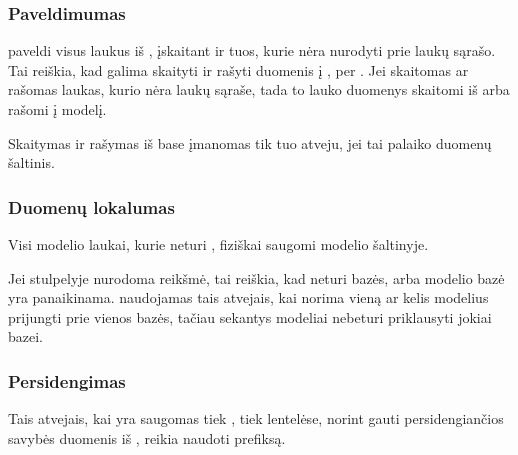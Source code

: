 \documentclass[letterpaper,10pt,lithuanian]{sphinxmanual}
\begin{document}
\subsubsection{Paveldimumas}
\label{\detokenize{dimensijos:paveldimumas}}
\sphinxAtStartPar
{\hyperref[\detokenize{formatas:model}]{}} paveldi visus laukus iš {\hyperref[\detokenize{formatas:base}]{}}, įskaitant ir tuos, kurie
nėra nurodyti prie {\hyperref[\detokenize{formatas:model}]{}} laukų sąrašo. Tai reiškia, kad galima skaityti
ir rašyti duomenis į {\hyperref[\detokenize{formatas:base}]{}}, per {\hyperref[\detokenize{formatas:model}]{}}. Jei skaitomas ar rašomas
laukas, kurio nėra {\hyperref[\detokenize{formatas:model}]{}} laukų sąraše, tada to lauko duomenys skaitomi
iš arba rašomi į {\hyperref[\detokenize{formatas:base}]{}} modelį.

\sphinxAtStartPar
Skaitymas ir rašymas iš base įmanomas tik tuo atveju, jei tai palaiko duomenų
šaltinis.


\subsubsection{Duomenų lokalumas}
\label{\detokenize{dimensijos:duomenu-lokalumas}}
\sphinxAtStartPar
Visi modelio laukai, kurie neturi {\hyperref[\detokenize{dimensijos:property.type}]{}}, fiziškai saugomi
{\hyperref[\detokenize{formatas:base}]{}} modelio šaltinyje.

\sphinxAtStartPar
Jei {\hyperref[\detokenize{formatas:base}]{}} stulpelyje nurodoma \sphinxcode{\sphinxupquote{/}} reikšmė, tai reiškia, kad
{\hyperref[\detokenize{formatas:model}]{}} neturi bazės, arba modelio bazė yra panaikinama. \sphinxcode{\sphinxupquote{/}} naudojamas
tais atvejais, kai norima vieną ar kelis modelius prijungti prie vienos bazės,
tačiau sekantys modeliai nebeturi priklausyti jokiai bazei.


\subsubsection{Persidengimas}
\label{\detokenize{dimensijos:persidengimas}}
\sphinxAtStartPar
Tais atvejais, kai {\hyperref[\detokenize{formatas:property}]{}} yra saugomas tiek {\hyperref[\detokenize{formatas:base}]{}}, tiek
{\hyperref[\detokenize{formatas:model}]{}} lentelėse, norint gauti persidengiančios savybės duomenis iš
{\hyperref[\detokenize{formatas:base}]{}}, reikia naudoti  prefiksą.
\end{document}
